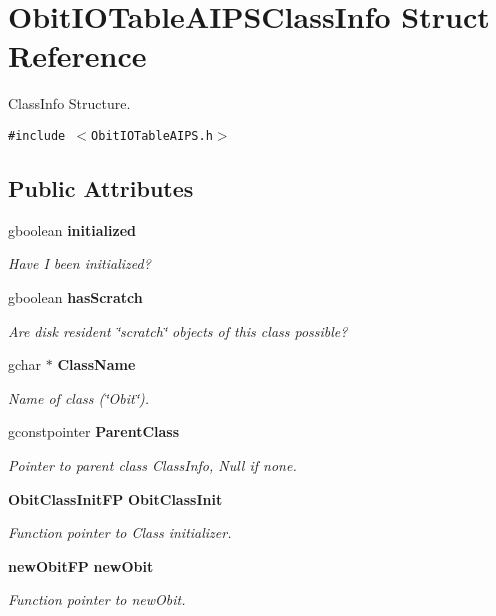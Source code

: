 \section{Obit\-IOTable\-AIPSClass\-Info Struct Reference}
\label{structObitIOTableAIPSClassInfo}
Class\-Info Structure.  


{\tt \#include $<$Obit\-IOTable\-AIPS.h$>$}

\subsection*{Public Attributes}
\begin{CompactItemize}
\item 
gboolean {\bf initialized}
\begin{CompactList}\small\item\em Have I been initialized? \item\end{CompactList}\item 
gboolean {\bf has\-Scratch}
\begin{CompactList}\small\item\em Are disk resident \char`\"{}scratch\char`\"{} objects of this class possible? \item\end{CompactList}\item 
gchar $\ast$ {\bf Class\-Name}
\begin{CompactList}\small\item\em Name of class (\char`\"{}Obit\char`\"{}). \item\end{CompactList}\item 
gconstpointer {\bf Parent\-Class}
\begin{CompactList}\small\item\em Pointer to parent class Class\-Info, Null if none. \item\end{CompactList}\item 
{\bf Obit\-Class\-Init\-FP} {\bf Obit\-Class\-Init}
\begin{CompactList}\small\item\em Function pointer to Class initializer. \item\end{CompactList}\item 
{\bf new\-Obit\-FP} {\bf new\-Obit}
\begin{CompactList}\small\item\em Function pointer to new\-Obit. \item\end{CompactList}\item 

\end{CompactItemize}
